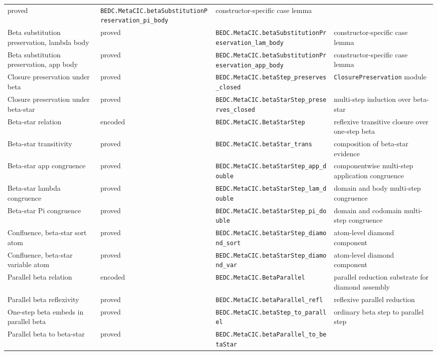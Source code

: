 \begin{longtable}{p{}p{}p{}p{}}
proved &
\texttt{BEDC.MetaCIC.betaSubstitutionPreservation\_pi\_body} &
constructor-specific case lemma\\
Beta substitution preservation, lambda body &
proved &
\texttt{BEDC.MetaCIC.betaSubstitutionPreservation\_lam\_body} &
constructor-specific case lemma\\
Beta substitution preservation, app body &
proved &
\texttt{BEDC.MetaCIC.betaSubstitutionPreservation\_app\_body} &
constructor-specific case lemma\\
Closure preservation under beta &
proved &
\texttt{BEDC.MetaCIC.betaStep\_preserves\_closed} &
\texttt{ClosurePreservation} module\\
Closure preservation under beta-star &
proved &
\texttt{BEDC.MetaCIC.betaStarStep\_preserves\_closed} &
multi-step induction over beta-star\\
Beta-star relation &
encoded &
\texttt{BEDC.MetaCIC.BetaStarStep} &
reflexive transitive closure over one-step beta\\
Beta-star transitivity &
proved &
\texttt{BEDC.MetaCIC.betaStar\_trans} &
composition of beta-star evidence\\
Beta-star app congruence &
proved &
\texttt{BEDC.MetaCIC.betaStarStep\_app\_double} &
componentwise multi-step application congruence\\
Beta-star lambda congruence &
proved &
\texttt{BEDC.MetaCIC.betaStarStep\_lam\_double} &
domain and body multi-step congruence\\
Beta-star Pi congruence &
proved &
\texttt{BEDC.MetaCIC.betaStarStep\_pi\_double} &
domain and codomain multi-step congruence\\
Confluence, beta-star sort atom &
proved &
\texttt{BEDC.MetaCIC.betaStarStep\_diamond\_sort} &
atom-level diamond component\\
Confluence, beta-star variable atom &
proved &
\texttt{BEDC.MetaCIC.betaStarStep\_diamond\_var} &
atom-level diamond component\\
Parallel beta relation &
encoded &
\texttt{BEDC.MetaCIC.BetaParallel} &
parallel reduction substrate for diamond assembly\\
Parallel beta reflexivity &
proved &
\texttt{BEDC.MetaCIC.betaParallel\_refl} &
reflexive parallel reduction\\
One-step beta embeds in parallel beta &
proved &
\texttt{BEDC.MetaCIC.betaStep\_to\_parallel} &
ordinary beta step to parallel step\\
Parallel beta to beta-star &
proved &
\texttt{BEDC.MetaCIC.betaParallel\_to\_betaStar} &

\end{longtable}
